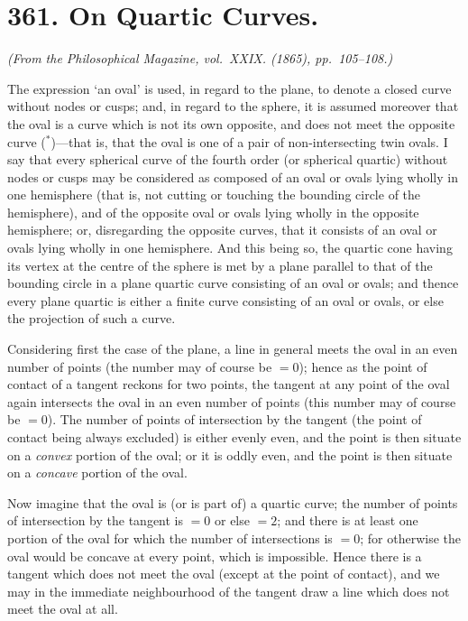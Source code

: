\documentclass[11pt,a4paper]{article}
\theoremstyle{plain}
\begin{document}
\vspace{1cm}

\section*{361. On Quartic Curves.\quad [361]}
\label{sec:361}

\begin{flushright}
\textit{(From the Philosophical Magazine, vol.~XXIX. (1865), pp.~105--108.)}
\end{flushright}

The expression `an oval' is used, in regard to the plane, to denote a closed curve without nodes or cusps; and, in regard to the sphere, it is assumed moreover that the oval is a curve which is not its own opposite, and does not meet the opposite curve ($^*$)---that is, that the oval is one of a pair of non-intersecting twin ovals. I say that every spherical curve of the fourth order (or spherical quartic) without nodes or cusps may be considered as composed of an oval or ovals lying wholly in one hemisphere (that is, not cutting or touching the bounding circle of the hemisphere), and of the opposite oval or ovals lying wholly in the opposite hemisphere; or, disregarding the opposite curves, that it consists of an oval or ovals lying wholly in one hemisphere. And this being so, the quartic cone having its vertex at the centre of the sphere is met by a plane parallel to that of the bounding circle in a plane quartic curve consisting of an oval or ovals; and thence every plane quartic is either a finite curve consisting of an oval or ovals, or else the projection of such a curve.

Considering first the case of the plane, a line in general meets the oval in an even number of points (the number may of course be $= 0$); hence as the point of contact of a tangent reckons for two points, the tangent at any point of the oval again intersects the oval in an even number of points (this number may of course be $= 0$). The number of points of intersection by the tangent (the point of contact being always excluded) is either evenly even, and the point is then situate on a \textit{convex} portion of the oval; or it is oddly even, and the point is then situate on a \textit{concave} portion of the oval.

Now imagine that the oval is (or is part of) a quartic curve; the number of points of intersection by the tangent is $= 0$ or else $= 2$; and there is at least one portion of the oval for which the number of intersections is $= 0$; for otherwise the oval would be concave at every point, which is impossible. Hence there is a tangent which does not meet the oval (except at the point of contact), and we may in the immediate neighbourhood of the tangent draw a line which does not meet the oval at all.
\end{document}
